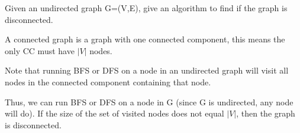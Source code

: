  \begin{prob}
     Given an undirected graph G=(V,E), give an algorithm to find if the graph is disconnected.
     \begin{soln}
         A connected graph is a graph with one connected component, this means the only CC must have $|V|$ nodes.

         Note that running BFS or DFS on a node in an undirected graph will visit all nodes in the connected component containing that node.

        Thus, we can run BFS or DFS on a node in G (since G is undirected, any node will do). If the size of the set of visited nodes does not equal $|V|$, then the graph is disconnected.

     \end{soln}
 \end{prob}

